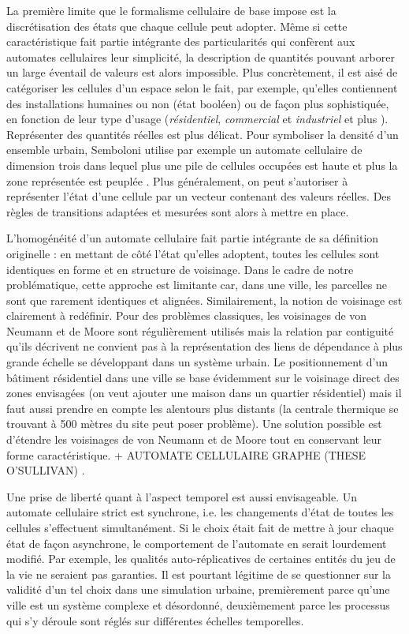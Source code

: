 \documentclass[10pt]{article}
\begin{document}
\begin{multicols}{2}
La première limite que le formalisme cellulaire de base impose est la
discrétisation des états que chaque cellule peut adopter. Même si
cette caractéristique fait partie intégrante des particularités qui
confèrent aux automates cellulaires leur simplicité, la description de
quantités pouvant arborer un large éventail de valeurs est alors
impossible. Plus concrètement, il est aisé de catégoriser les cellules
d'un espace selon le fait, par exemple, qu'elles contiennent des
installations humaines ou non (état booléen)
\cite{Benguigui2004,Cornu} ou de façon plus sophistiquée, en fonction
de leur type d'usage (\textit{résidentiel}, \textit{commercial} et
\textit{industriel} \cite{Lechner} et plus
\cite{Dubos-Paillard203}). Représenter des quantités réelles est plus
délicat. Pour symboliser la densité d'un ensemble urbain, Semboloni
utilise par exemple un automate cellulaire de dimension trois dans
lequel plus une pile de cellules occupées est haute et plus la zone
représentée est peuplée \cite{Semboloni2000}. Plus généralement, on
peut s'autoriser à représenter l'état d'une cellule par un vecteur
contenant des valeurs réelles. Des règles de transitions adaptées et
mesurées sont alors à mettre en place.

L'homogénéité d'un automate cellulaire fait partie intégrante de sa
définition originelle : en mettant de côté l'état qu'elles adoptent,
toutes les cellules sont identiques en forme et en structure de
voisinage. Dans le cadre de notre problématique, cette approche est
limitante car, dans une ville, les parcelles ne sont que rarement
identiques et alignées. Similairement, la notion de voisinage est
clairement à redéfinir. Pour des problèmes classiques, les voisinages
de von Neumann et de Moore sont régulièrement utilisés mais la
relation par contiguité qu'ils décrivent ne convient pas à la
représentation des liens de dépendance à plus grande échelle se
développant dans un système urbain. Le positionnement d'un bâtiment
résidentiel dans une ville se base évidemment sur le voisinage direct
des zones envisagées (on veut ajouter une maison dans un quartier
résidentiel) mais il faut aussi prendre en compte les alentours plus
distants (la centrale thermique se trouvant à 500 mètres du site peut
poser problème). Une solution possible est d'étendre les voisinages de
von Neumann et de Moore tout en conservant leur forme
caractéristique. + AUTOMATE CELLULAIRE GRAPHE (THESE O'SULLIVAN)
\cite{O'Sullivan2000,0'Sullivan2001}.

Une prise de liberté quant à l'aspect temporel est aussi
envisageable. Un automate cellulaire strict est synchrone, i.e. les
changements d'état de toutes les cellules s'effectuent
simultanément. Si le choix était fait de mettre à jour chaque état de
façon asynchrone, le comportement de l'automate en serait lourdement
modifié. Par exemple, les qualités auto-réplicatives de certaines
entités du jeu de la vie ne seraient pas garanties. Il est pourtant
légitime de se questionner sur la validité d'un tel choix dans une
simulation urbaine, premièrement parce qu'une ville est un système
complexe et désordonné, deuxièmement parce les processus qui s'y
déroule sont réglés sur différentes échelles temporelles.


\end{multicols}
\end{document}
